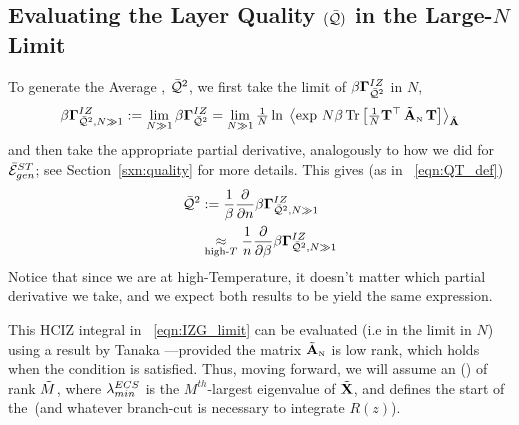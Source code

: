 \subsection{Evaluating the Layer Quality \texorpdfstring{$(\bar{\mathcal{Q}})$}{Q} in the Large-\texorpdfstring{$N$}{N} Limit}
\label{sxn:matgen_evaluation_hciz}

%
To generate the Average \Quality, $\bar{\mathcal{Q}}^{2}$, we first take the \LargeN limit of $\beta\mathbf{\Gamma}^{IZ}_{\bar{\mathcal{Q}}^{2}}$ in $N$,
\begin{equation}
  \label{eqn:IZG_limit}
\IZGINF := \lim_{N \gg 1} \IZG 
= \lim_{N \gg 1}  \tfrac{1}{N}
\ln \; 
  \Expected[\AECS]{ 
    \exp\,
      N \beta \Trace{\tfrac{1}{N}\TMAT^{\top}\,\AECSN\,\TMAT}
  } 
\end{equation}
and then take the appropriate partial derivative,
analogously to how we did for $\bar{\mathcal{E}}^{ST}_{gen}$; see Section~\ref{sxn:quality} for more details.
This gives (as in \EQN~\ref{eqn:QT_def})
\begin{align}
\label{eqn:IZG_generate_Q2}
\QT &:= \frac{1}{\beta}\frac{\partial }{\partial \ND}\IZGINF  \\ 
&\underset{\text{high-}T}{\approx}
\frac{1}{\ND}\frac{\partial }{\partial \beta}\IZGINF 
\end{align}
Notice that since we are at high-Temperature, it doesn't matter which partial derivative we take,
and we expect both results to be yield the same expression.

This HCIZ integral in \EQN~\ref{eqn:IZG_limit} can be evaluated
(i.e in the \LargeN limit in $N$) using a result by Tanaka ---provided
the matrix $\tilde{\mathbf{A}}_{\text{\tiny N}}$ is low rank, which holds when the \TRACELOG condition is satisfied.
Thus, moving forward, we will assume an
\EffectiveCorrelationSpace (\ECS) of rank $\tilde{M}$, where $\lambda^{ECS}_{min}$ is the $M^{th}$-largest eigenvalue of $\tilde{\mathbf{X}}$,
and defines the start of the~\ECS (and whatever branch-cut is necessary to integrate $R(z)$).

